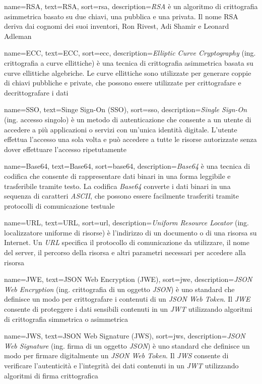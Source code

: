  {
    name=RSA,
    text=RSA,
    sort=rsa,
    description={\emph{RSA} è un algoritmo di crittografia asimmetrica basato su due chiavi, una pubblica e una privata. Il nome RSA deriva dai cognomi dei suoi inventori, Ron Rivest, Adi Shamir e Leonard Adleman}
}

 {
    name=ECC,
    text=ECC,
    sort=ecc,
    description={\emph{Elliptic Curve Cryptography} (ing. crittografia a curve ellittiche) è una tecnica di crittografia asimmetrica basata su curve ellittiche algebriche. Le curve ellittiche sono utilizzate per generare coppie di chiavi pubbliche e private, che possono essere utilizzate per crittografare e decrittografare i dati}
}

 {
    name=SSO,
    text=Singe Sign-On (SSO),
    sort=sso,
    description={\emph{Single Sign-On} (ing. accesso singolo) è un metodo di autenticazione che consente a un utente di accedere a più applicazioni o servizi con un'unica identità digitale. L'utente effettua l'accesso una sola volta e può accedere a tutte le risorse autorizzate senza dover effettuare l'accesso ripetutamente}
}

 {
    name=Base64,
    text=Base64,
    sort=base64,
    description={\emph{Base64} è una tecnica di codifica che consente di rappresentare dati binari in una forma leggibile e trasferibile tramite testo. La codifica \emph{Base64} converte i dati binari in una sequenza di caratteri \emph{ASCII}, che possono essere facilmente trasferiti tramite protocolli di comunicazione testuale}
}

 {
    name=URL,
    text=URL,
    sort=url,
    description={\emph{Uniform Resource Locator} (ing. localizzatore uniforme di risorse) è l'indirizzo di un documento o di una risorsa su Internet. Un \emph{URL} specifica il protocollo di comunicazione da utilizzare, il nome del server, il percorso della risorsa e altri parametri necessari per accedere alla risorsa}
}

 {
    name=JWE,
    text=JSON Web Encryption (JWE),
    sort=jwe,
    description={\emph{JSON Web Encryption} (ing. crittografia di un oggetto \emph{JSON}) è uno standard che definisce un modo per crittografare i contenuti di un \emph{JSON Web Token}. Il \emph{JWE} consente di proteggere i dati sensibili contenuti in un \emph{JWT} utilizzando algoritmi di crittografia simmetrica o asimmetrica}
}

 {
    name=JWS,
    text=JSON Web Signature (JWS),
    sort=jws,
    description={\emph{JSON Web Signature} (ing. firma di un oggetto \emph{JSON}) è uno standard che definisce un modo per firmare digitalmente un \emph{JSON Web Token}. Il \emph{JWS} consente di verificare l'autenticità e l'integrità dei dati contenuti in un \emph{JWT} utilizzando algoritmi di firma crittografica}
}

